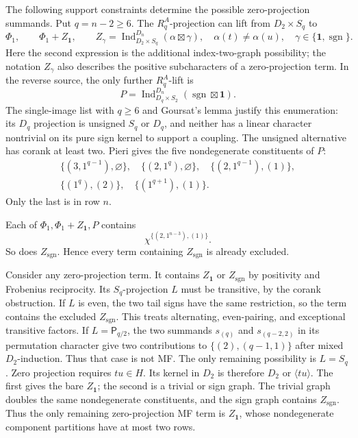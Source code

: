 \documentclass[11pt]{article}
\numberwithin{equation}{section}
\theoremstyle{definition}
\DeclareMathOperator{\Ind}{Ind}
\DeclareMathOperator{\sgn}{sgn}
\newcommand{\emptypar}{\varnothing}
\newcommand{\one}{\mathbf 1}
\newcommand{\pair}{\mathsf P}
\begin{document}
The following support constraints determine the possible zero-projection summands.
Put \(q=n-2\geq6\).
The \(R_q^A\)-projection can lift from \(D_2\times S_q\) to
\[
 \Phi_1,\qquad \Phi_1+Z_{\one},\qquad
 Z_\gamma=\Ind_{D_2\times S_q}^{D_n}(\alpha\boxtimes\gamma),
 \quad\alpha(t)\ne\alpha(u),\quad\gamma\in\{\one,\sgn\}.
\]
Here the second expression is the additional index-two-graph possibility; the notation \(Z_\gamma\) also describes the positive subcharacters of a zero-projection term.
In the reverse source, the only further \(R_q^A\)-lift is
\[
 P=\Ind_{D_q\times S_2}^{D_n}(\sgn\boxtimes\one).
\]
The single-image list with \(q\geq6\) and Goursat's lemma justify this enumeration: its \(D_q\) projection is unsigned \(S_q\) or \(D_q\), and neither has a linear character nontrivial on its pure sign kernel to support a coupling.
The unsigned alternative has corank at least two.
Pieri gives the five nondegenerate constituents of \(P\):
\begin{equation}
 \begin{gathered}
 \{(3,1^{q-1}),\emptypar\},\quad
 \{(2,1^q),\emptypar\},\quad
 \{(2,1^{q-1}),(1)\},\\
 \{(1^q),(2)\},\quad
 \{(1^{q+1}),(1)\}.
 \end{gathered}
 \label{eq:Dreversefive}
\end{equation}
Only the last is in row \(n\).

Each of \(\Phi_1,\Phi_1+Z_{\one},P\) contains
\[
 \chi^{\{(2,1^{n-3}),(1)\}} .
\]
So does \(Z_{\sgn}\).
Hence every term containing \(Z_{\sgn}\) is already excluded.

Consider any zero-projection term.
It contains \(Z_{\one}\) or \(Z_{\sgn}\) by positivity and Frobenius reciprocity.
Its \(S_q\)-projection \(L\) must be transitive, by the corank obstruction.
If \(L\) is even, the two tail signs have the same restriction, so the term contains the excluded \(Z_{\sgn}\).
This treats alternating, even-pairing, and exceptional transitive factors.
If \(L=\pair_{q/2}\), the two summands \(s_{(q)}\) and \(s_{(q-2,2)}\) in its permutation character give two contributions to
\(\{(2),(q-1,1)\}\) after mixed \(D_2\)-induction.
Thus that case is not MF.
The only remaining possibility is \(L=S_q\).
Zero projection requires \(tu\in H\).
Its kernel in \(D_2\) is therefore \(D_2\) or \(\langle tu\rangle\).
The first gives the bare \(Z_{\one}\); the second is a trivial or sign graph.
The trivial graph doubles the same nondegenerate constituents, and the sign graph contains \(Z_{\sgn}\).
Thus the only remaining zero-projection MF term is \(Z_{\one}\), whose nondegenerate component partitions have at most two rows.
\end{document}
